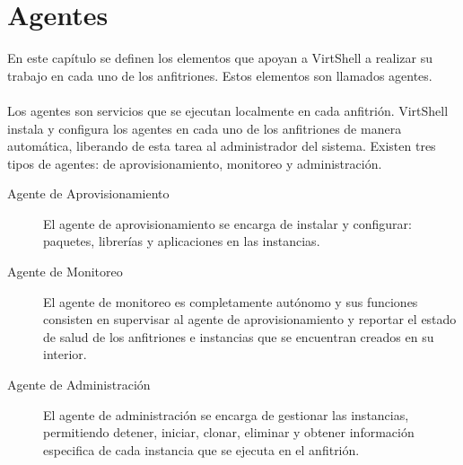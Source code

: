 \chapter{Agentes}
\label{capagents}

En este capítulo se definen los elementos que apoyan a VirtShell a realizar su trabajo en cada uno de los anfitriones. Estos elementos son llamados agentes.\\
\\
Los agentes son servicios que se ejecutan localmente en cada anfitrión. VirtShell instala y configura los agentes en cada uno de los anfitriones de manera automática, liberando de esta tarea al administrador del sistema. Existen tres tipos de agentes: de aprovisionamiento, monitoreo y administración.

\begin{description}
\item [Agente de Aprovisionamiento]
El agente de aprovisionamiento se encarga de instalar y configurar: paquetes, librerías y aplicaciones en las instancias. 
\item [Agente de Monitoreo]
El agente de monitoreo es completamente autónomo y sus funciones consisten en supervisar al agente de aprovisionamiento y reportar el estado de salud de los anfitriones e instancias que se encuentran creados en su interior. 
\item [Agente de Administración]
El agente de administración se encarga de gestionar las instancias, permitiendo detener, iniciar, clonar, eliminar y obtener información especifica de cada instancia que se ejecuta en el anfitrión.
\end{description}